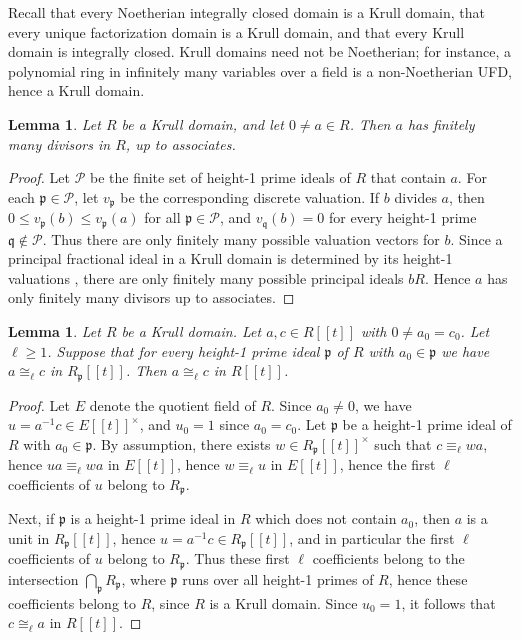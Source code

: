 \documentclass{article}
\newcommand{\frp}{\mathfrak{p}}
\theoremstyle{plain}
\newtheorem{lemma}[theorem]{Lemma}
\theoremstyle{definition}
\theoremstyle{remark}
\theoremstyle{plain}
\begin{document}
Recall \cite[Chapter VII, \S1]{BourbakiCA} that every Noetherian integrally closed domain is a Krull domain, that every unique factorization domain is a Krull domain, and that every Krull domain is integrally closed. Krull domains need not be Noetherian; for instance, a polynomial ring in infinitely many variables over a field is a non-Noetherian UFD, hence a Krull domain.

\begin{lemma}
    Let $R$ be a Krull domain, and let $0 \neq a \in R$. Then $a$ has finitely many divisors in $R$, up to associates. 
\end{lemma}
\begin{proof}
Let $\mathcal P$ be the finite set of height-1 prime ideals of $R$ that contain $a$. For each $\frp \in \mathcal P$, let $v_\frp$ be the corresponding discrete valuation. If $b$ divides $a$, then $0 \leq v_\frp(b) \leq v_\frp(a)$ for all $\frp \in \mathcal P$, and $v_{\mathfrak q}(b)=0$ for every height-1 prime $\mathfrak q \notin \mathcal P$. Thus there are only finitely many possible valuation vectors for $b$. Since a principal fractional ideal in a Krull domain is determined by its height-1 valuations \cite[Chapter VII, \S1]{BourbakiCA}, there are only finitely many possible principal ideals $bR$. Hence $a$ has only finitely many divisors up to associates.
\end{proof}

\begin{lemma}\label{V_to_R}
    Let $R$ be a Krull domain. Let $a,c \in R[[t]]$ with $0 \neq a_0 = c_0$. Let $\ell \geq 1$. Suppose that for every height-1 prime ideal $\frp$ of $R$ with $a_0 \in \frp$ we have $a \cong_\ell c$ in $R_\frp[[t]]$. Then $a \cong_\ell c$ in $R[[t]]$. 
\end{lemma}
\begin{proof}
         
  Let $E$ denote the quotient field of $R$. 
Since $a_0 \neq 0$, we have $u = a^{-1}c \in E[[t]]^\times$, and $u_0 = 1$ since $a_0 = c_0$. Let $\frp$ be a height-1 prime ideal of $R$ with $a_0\in \frp$. By assumption, there exists $w \in R_\frp[[t]]^\times$ such that $c \equiv_\ell wa$, hence $ua \equiv_\ell wa$ in $E[[t]]$, hence $w \equiv_\ell u$ in $E[[t]]$, hence the first $\ell$ coefficients of $u$ belong to $R_\frp$. 

Next, if $\frp$ is a height-1 prime ideal in $R$ which does not contain $a_0$, then $a$ is a unit in $R_\frp[[t]]$, hence $u = a^{-1}c \in R_\frp[[t]]$, and in particular the first $\ell$ coefficients of $u$ belong to $R_\frp$. Thus these first $\ell$ coefficients belong to the intersection $\bigcap_\frp R_\frp$, where $\frp$ runs over all height-1 primes of $R$, hence these coefficients belong to $R$, since $R$ is a Krull domain. Since $u_0 = 1$, it follows that $c \cong_\ell a$ in $R[[t]]$.

\end{proof}
\end{document}
